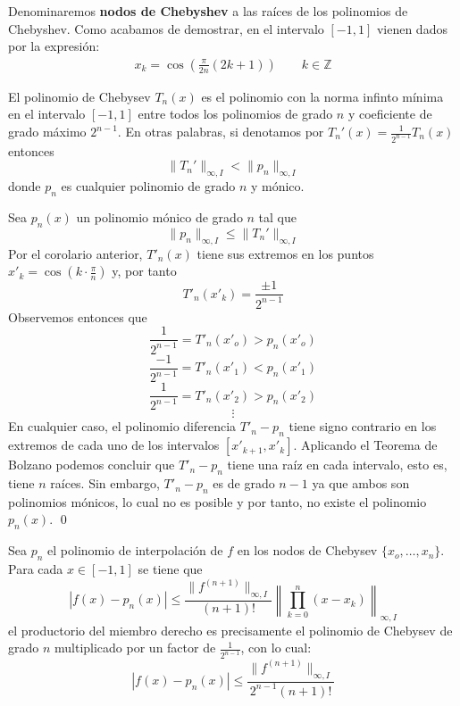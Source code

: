         \begin{defin}
        Denominaremos \textbf{nodos de Chebyshev} a las raíces de los polinomios de Chebyshev. Como acabamos de demostrar, en el intervalo $[-1,1]$ vienen dados por la expresión:
        \begin{align}
        x_k=\cos\left(\frac{\pi}{2n}(2k+1)\right)\qquad k\in \mathbb{Z}
        \label{nodos:cheb}
        \end{align}
        \end{defin}
        \begin{teo}
        El polinomio de Chebysev $T_n(x)$ es el polinomio con la norma infinto mínima en el intervalo $[-1,1]$ entre todos los polinomios de grado $n$ y coeficiente de grado máximo $2^{n-1}$. En otras palabras, si denotamos por $T_n'(x)=\frac{1}{2^{n-1}}T_n(x)$ entonces
        $$\|T_n'\|_{\infty,I}<\|p_n\|_{\infty,I}$$
        donde $p_n$ es cualquier polinomio de grado $n$ y mónico.
        \end{teo}
        \begin{dem}
        Sea $p_n(x)$ un polinomio mónico de grado $n$ tal que
        $$\|p_n\|_{\infty,I}\leq\|T_n'\|_{\infty,I}$$
        Por el corolario anterior, $T'_n(x)$ tiene sus extremos en los puntos $x'_k=\cos\left(k\cdot\frac{\pi}{n}\right)$ y, por tanto
        $$T'_n(x'_k)=\frac{\pm 1}{2^{n-1}}$$
        Observemos entonces que
        $$\frac{1}{2^{n-1}}=T'_n(x'_o)>p_n(x'_o)$$
        $$\frac{-1}{2^{n-1}}=T'_n(x'_1)<p_n(x'_1)$$
        $$\frac{1}{2^{n-1}}=T'_n(x'_2)>p_n(x'_2)$$
        $$\vdots$$
        En cualquier caso, el polinomio  diferencia $T'_n-p_n$ tiene signo contrario en los extremos de cada uno de los intervalos $[x'_{k+1},x'_k]$. Aplicando el Teorema de Bolzano podemos concluir que $T'_n-p_n$ tiene una raíz en cada intervalo, esto es, tiene $n$ raíces. Sin embargo, $T'_n-p_n$ es de grado $n-1$ ya que ambos son polinomios mónicos, lo cual no es posible y por tanto, no existe el polinomio $p_n(x)$.
        \qed\end{dem}
        \begin{cor}
        Sea $p_n$ el polinomio de interpolación de $f$ en los nodos de Chebysev $\{x_o,\ldots,x_n\}$. Para cada $x\in[-1,1]$ se tiene que
        $$|f(x)-p_n(x)|\leq\frac{\|f^{(n+1)}\|_{\infty,I}}{(n+1)!}\left\|\prod_{k=0}^n(x-x_k)\right\|_{\infty,I}$$
    el productorio del miembro derecho es precisamente el polinomio de Chebysev de grado $n$ multiplicado por un factor de $\frac{1}{2^{n-1}}$, con lo cual:
    $$|f(x)-p_n(x)|\leq \frac{\|f^{(n+1)}\|_{\infty,I}}{2^{n-1}(n+1)!}$$
        \end{cor}
